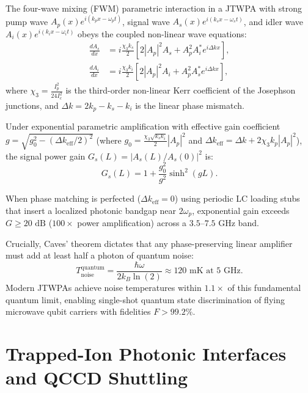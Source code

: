 The four-wave mixing (FWM) parametric interaction in a JTWPA with strong pump wave $A_p(x) e^{i(k_p x - \omega_p t)}$, signal wave $A_s(x) e^{i(k_s x - \omega_s t)}$, and idler wave $A_i(x) e^{i(k_i x - \omega_i t)}$ obeys the coupled non-linear wave equations:
\begin{align}
    \frac{d A_s}{dx} &= i \frac{\chi_3 k_s}{2} \left[ 2 |A_p|^2 A_s + A_p^2 A_i^* e^{i \Delta k x} \right], \\
    \frac{d A_i}{dx} &= i \frac{\chi_3 k_i}{2} \left[ 2 |A_p|^2 A_i + A_p^2 A_s^* e^{i \Delta k x} \right],
\end{align}
where $\chi_3 = \frac{I_p^2}{24 I_c^2}$ is the third-order non-linear Kerr coefficient of the Josephson junctions, and $\Delta k = 2 k_p - k_s - k_i$ is the linear phase mismatch.

Under exponential parametric amplification with effective gain coefficient $g = \sqrt{g_0^2 - (\Delta k_{\text{eff}}/2)^2}$ (where $g_0 = \frac{\chi_3 \sqrt{k_s k_i}}{2} |A_p|^2$ and $\Delta k_{\text{eff}} = \Delta k + 2 \chi_3 k_p |A_p|^2$), the signal power gain $G_s(L) = |A_s(L)/A_s(0)|^2$ is:
\begin{equation}
    G_s(L) = 1 + \frac{g_0^2}{g^2} \sinh^2(g L).
    \label{eq:twpa_gain_formula}
\end{equation}

When phase matching is perfected ($\Delta k_{\text{eff}} = 0$) using periodic LC loading stubs that insert a localized photonic bandgap near $2\omega_p$, exponential gain exceeds $G \ge 20\text{ dB}$ ($100\times$ power amplification) across a $3.5\text{--}7.5\text{ GHz}$ band.

Crucially, Caves' theorem dictates that any phase-preserving linear amplifier must add at least half a photon of quantum noise:
\begin{equation}
    T_{\text{noise}}^{\text{quantum}} = \frac{\hbar \omega}{2 k_B \ln(2)} \approx 120\text{ mK at } 5\text{ GHz}.
    \label{eq:quantum_noise_temp_caves}
\end{equation}
Modern JTWPAs achieve noise temperatures within $1.1\times$ of this fundamental quantum limit, enabling single-shot quantum state discrimination of flying microwave qubit carriers with fidelities $F > 99.2\%$.


\section{Trapped-Ion Photonic Interfaces and QCCD Shuttling}
\label{sec:trapped_ion_interconnects}

